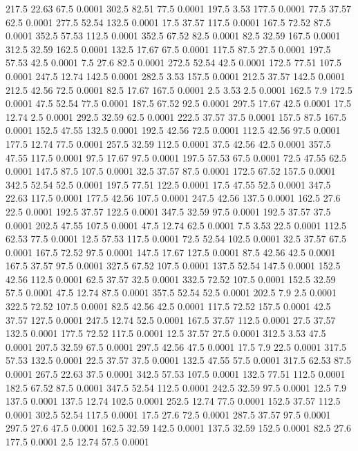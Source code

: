 217.5	22.63	67.5	0.0001
302.5	82.51	77.5	0.0001
197.5	3.53	177.5	0.0001
77.5	37.57	62.5	0.0001
277.5	52.54	132.5	0.0001
17.5	37.57	117.5	0.0001
167.5	72.52	87.5	0.0001
352.5	57.53	112.5	0.0001
352.5	67.52	82.5	0.0001
82.5	32.59	167.5	0.0001
312.5	32.59	162.5	0.0001
132.5	17.67	67.5	0.0001
117.5	87.5	27.5	0.0001
197.5	57.53	42.5	0.0001
7.5	27.6	82.5	0.0001
272.5	52.54	42.5	0.0001
172.5	77.51	107.5	0.0001
247.5	12.74	142.5	0.0001
282.5	3.53	157.5	0.0001
212.5	37.57	142.5	0.0001
212.5	42.56	72.5	0.0001
82.5	17.67	167.5	0.0001
2.5	3.53	2.5	0.0001
162.5	7.9	172.5	0.0001
47.5	52.54	77.5	0.0001
187.5	67.52	92.5	0.0001
297.5	17.67	42.5	0.0001
17.5	12.74	2.5	0.0001
292.5	32.59	62.5	0.0001
222.5	37.57	37.5	0.0001
157.5	87.5	167.5	0.0001
152.5	47.55	132.5	0.0001
192.5	42.56	72.5	0.0001
112.5	42.56	97.5	0.0001
177.5	12.74	77.5	0.0001
257.5	32.59	112.5	0.0001
37.5	42.56	42.5	0.0001
357.5	47.55	117.5	0.0001
97.5	17.67	97.5	0.0001
197.5	57.53	67.5	0.0001
72.5	47.55	62.5	0.0001
147.5	87.5	107.5	0.0001
32.5	37.57	87.5	0.0001
172.5	67.52	157.5	0.0001
342.5	52.54	52.5	0.0001
197.5	77.51	122.5	0.0001
17.5	47.55	52.5	0.0001
347.5	22.63	117.5	0.0001
177.5	42.56	107.5	0.0001
247.5	42.56	137.5	0.0001
162.5	27.6	22.5	0.0001
192.5	37.57	122.5	0.0001
347.5	32.59	97.5	0.0001
192.5	37.57	37.5	0.0001
202.5	47.55	107.5	0.0001
47.5	12.74	62.5	0.0001
7.5	3.53	22.5	0.0001
112.5	62.53	77.5	0.0001
12.5	57.53	117.5	0.0001
72.5	52.54	102.5	0.0001
32.5	37.57	67.5	0.0001
167.5	72.52	97.5	0.0001
147.5	17.67	127.5	0.0001
87.5	42.56	42.5	0.0001
167.5	37.57	97.5	0.0001
327.5	67.52	107.5	0.0001
137.5	52.54	147.5	0.0001
152.5	42.56	112.5	0.0001
62.5	37.57	32.5	0.0001
332.5	72.52	107.5	0.0001
152.5	32.59	57.5	0.0001
47.5	12.74	87.5	0.0001
357.5	52.54	52.5	0.0001
202.5	7.9	2.5	0.0001
322.5	72.52	107.5	0.0001
82.5	42.56	42.5	0.0001
117.5	72.52	157.5	0.0001
42.5	37.57	127.5	0.0001
247.5	12.74	52.5	0.0001
167.5	37.57	112.5	0.0001
27.5	37.57	132.5	0.0001
177.5	72.52	117.5	0.0001
12.5	37.57	27.5	0.0001
312.5	3.53	47.5	0.0001
207.5	32.59	67.5	0.0001
297.5	42.56	47.5	0.0001
17.5	7.9	22.5	0.0001
317.5	57.53	132.5	0.0001
22.5	37.57	37.5	0.0001
132.5	47.55	57.5	0.0001
317.5	62.53	87.5	0.0001
267.5	22.63	37.5	0.0001
342.5	57.53	107.5	0.0001
132.5	77.51	112.5	0.0001
182.5	67.52	87.5	0.0001
347.5	52.54	112.5	0.0001
242.5	32.59	97.5	0.0001
12.5	7.9	137.5	0.0001
137.5	12.74	102.5	0.0001
252.5	12.74	77.5	0.0001
152.5	37.57	112.5	0.0001
302.5	52.54	117.5	0.0001
17.5	27.6	72.5	0.0001
287.5	37.57	97.5	0.0001
297.5	27.6	47.5	0.0001
162.5	32.59	142.5	0.0001
137.5	32.59	152.5	0.0001
82.5	27.6	177.5	0.0001
2.5	12.74	57.5	0.0001
